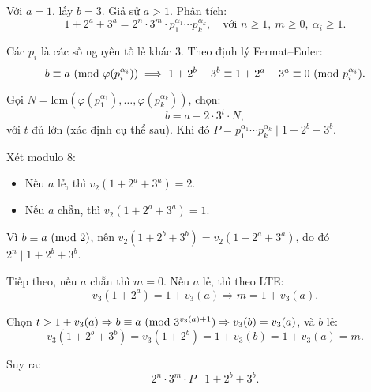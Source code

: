 \documentclass[../09-contruction-methods.tex]{subfiles}
\begin{document}

\newpage

\begin{soln}\footnotemark
	Với \( a = 1 \), lấy \( b = 3 \). Giả sử \( a > 1 \). Phân tích:
	\[
		1 + 2^a + 3^a = 2^n \cdot 3^m \cdot p_1^{\alpha_1} \cdots p_k^{\alpha_k}, \quad \text{với } n \ge 1,\ m \ge 0,\ \alpha_i \ge 1.
	\]

	Các \( p_i \) là các số nguyên tố lẻ khác \( 3 \). Theo định lý Fermat–Euler:
	\[
		b \equiv a \ (\mathrm{mod}\ \varphi(p_i^{\alpha_i})) \implies 1 + 2^b + 3^b \equiv 1 + 2^a + 3^a \equiv 0 \ (\mathrm{mod}\ p_i^{\alpha_i}).
	\]

	Gọi \( N = \text{lcm}(\varphi(p_1^{\alpha_1}), \dots, \varphi(p_k^{\alpha_k})) \), chọn:
	\[
		b = a + 2 \cdot 3^t \cdot N,
	\]
	với \( t \) đủ lớn (xác định cụ thể sau). Khi đó \( P = p_1^{\alpha_1} \cdots p_k^{\alpha_k} \mid 1 + 2^b + 3^b \).

	Xét modulo 8:
	\begin{itemize}[topsep=0pt, partopsep=0pt, itemsep=0pt]
		\item Nếu \( a \) lẻ, thì \( v_2(1 + 2^a + 3^a) = 2 \).
		\item Nếu \( a \) chẵn, thì \( v_2(1 + 2^a + 3^a) = 1 \).
	\end{itemize}

	Vì \( b \equiv a \ (\mathrm{mod}\ 2) \), nên \( v_2(1 + 2^b + 3^b) = v_2(1 + 2^a + 3^a) \), do đó \( 2^n \mid 1 + 2^b + 3^b \).

	Tiếp theo, nếu \( a \) chẵn thì \( m = 0 \). Nếu \( a \) lẻ, thì theo LTE:
	\[
		v_3(1 + 2^a) = 1 + v_3(a) \Rightarrow m = 1 + v_3(a).
	\]

	Chọn \( t > 1 + v_3(a) \Rightarrow b \equiv a \ (\mathrm{mod}\ 3^{v_3(a)+1}) \Rightarrow v_3(b) = v_3(a) \), và \( b \) lẻ:
	\[
		v_3(1 + 2^b + 3^b) = v_3(1 + 2^b) = 1 + v_3(b) = 1 + v_3(a) = m.
	\]

	Suy ra:
	\[
		2^n \cdot 3^m \cdot P \mid 1 + 2^b + 3^b.
	\]
\end{soln}

\end{document}

